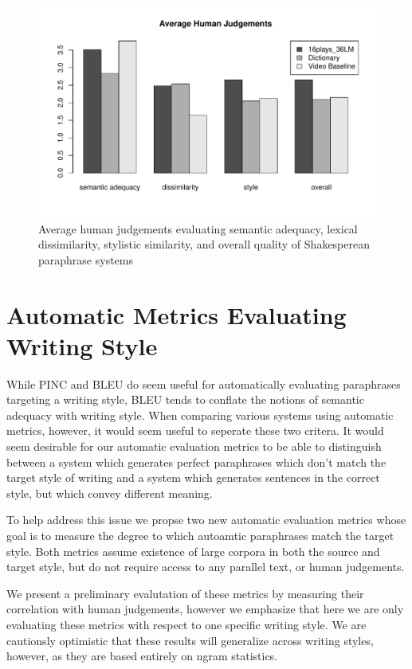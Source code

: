 \documentclass[10pt,a5paper,twoside]{article}
\begin{document}
\begin{figure}
  \begin{center}
    \includegraphics[width=5in]{figures/human_judgements.pdf}
  \end{center}
  \caption{Average human judgements evaluating semantic adequacy, lexical dissimilarity, stylistic similarity, and overall quality
    of Shakesperean paraphrase systems} 
  \label{human_judgements}
\end{figure}

\section{Automatic Metrics Evaluating Writing Style}
While PINC and BLEU do seem useful for automatically evaluating paraphrases targeting a  writing style, BLEU tends to conflate the notions of
semantic adequacy with writing style.  When comparing various systems using automatic metrics, however, it would seem useful
to seperate these two critera.  It would seem desirable for our automatic evaluation metrics to be able to distinguish
between a system which generates perfect paraphrases which don't match the target style of writing and a system which
generates sentences in the correct style, but which convey different meaning.

To help address this issue we propse two new automatic evaluation metrics whose goal is to measure the degree to which
autoamtic paraphrases match the target style.  Both metrics assume existence of large corpora in both the source and
target style, but do not require access to any parallel text, or human judgements.

We present a preliminary evalutation of these metrics by measuring their correlation with human judgements, however
we emphasize that here we are only evaluating these metrics with respect to one specific writing style.  We
are cautionsly optimistic that these results will generalize across writing styles, however, as they are based entirely
on ngram statistics.
\end{document}

